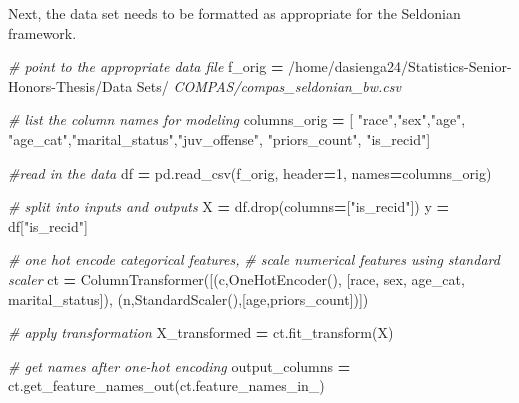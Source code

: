 \documentclass[12pt, twoside]{amherstthesis}
\newenvironment{Shaded}{\begin{snugshade}}{\end{snugshade}}
\newcommand{\CommentTok}[1]{\textcolor[rgb]{0.56,0.35,0.01}{\textit{#1}}}
\newcommand{\DecValTok}[1]{\textcolor[rgb]{0.00,0.00,0.81}{#1}}
\newcommand{\NormalTok}[1]{#1}
\newcommand{\OperatorTok}[1]{\textcolor[rgb]{0.81,0.36,0.00}{\textbf{#1}}}
\newcommand{\StringTok}[1]{\textcolor[rgb]{0.31,0.60,0.02}{#1}}
\begin{document}
\noindent Next, the data set needs to be formatted as appropriate for the Seldonian framework.
\begin{Shaded}
\begin{Highlighting}[]
\CommentTok{\# point to the appropriate data file}
\NormalTok{f\_orig }\OperatorTok{=} \StringTok{\textquotesingle{}/home/dasienga24/Statistics{-}Senior{-}Honors{-}Thesis/Data Sets/\textquotesingle{}}
\CommentTok{\textquotesingle{}COMPAS/compas\_seldonian\_bw.csv\textquotesingle{}}

\CommentTok{\# list the column names for modeling}
\NormalTok{columns\_orig }\OperatorTok{=}\NormalTok{ [}
    \StringTok{"race"}\NormalTok{,}\StringTok{"sex"}\NormalTok{,}\StringTok{"age"}\NormalTok{,}
    \StringTok{"age\_cat"}\NormalTok{,}\StringTok{"marital\_status"}\NormalTok{,}\StringTok{"juv\_offense"}\NormalTok{,}
    \StringTok{"priors\_count"}\NormalTok{, }\StringTok{"is\_recid"}\NormalTok{]}
    
\CommentTok{\#read in the data }
\NormalTok{df }\OperatorTok{=}\NormalTok{ pd.read\_csv(f\_orig, header}\OperatorTok{=}\DecValTok{1}\NormalTok{, names}\OperatorTok{=}\NormalTok{columns\_orig)}

\CommentTok{\# split into inputs and outputs}
\NormalTok{X }\OperatorTok{=}\NormalTok{ df.drop(columns}\OperatorTok{=}\NormalTok{[}\StringTok{"is\_recid"}\NormalTok{])}
\NormalTok{y }\OperatorTok{=}\NormalTok{ df[}\StringTok{"is\_recid"}\NormalTok{]}

\CommentTok{\# one hot encode categorical features,}
\CommentTok{\# scale numerical features using standard scaler }
\NormalTok{ct }\OperatorTok{=}\NormalTok{ ColumnTransformer([(}\StringTok{\textquotesingle{}c\textquotesingle{}}\NormalTok{,OneHotEncoder(),}
\NormalTok{[}\StringTok{\textquotesingle{}race\textquotesingle{}}\NormalTok{, }\StringTok{\textquotesingle{}sex\textquotesingle{}}\NormalTok{, }\StringTok{\textquotesingle{}age\_cat\textquotesingle{}}\NormalTok{, }\StringTok{\textquotesingle{}marital\_status\textquotesingle{}}\NormalTok{]), }
\NormalTok{(}\StringTok{\textquotesingle{}n\textquotesingle{}}\NormalTok{,StandardScaler(),[}\StringTok{\textquotesingle{}age\textquotesingle{}}\NormalTok{,}\StringTok{\textquotesingle{}priors\_count\textquotesingle{}}\NormalTok{])])}
    
\CommentTok{\# apply transformation}
\NormalTok{X\_transformed }\OperatorTok{=}\NormalTok{ ct.fit\_transform(X)}
    
\CommentTok{\# get names after one{-}hot encoding}
\NormalTok{output\_columns }\OperatorTok{=}\NormalTok{ ct.get\_feature\_names\_out(ct.feature\_names\_in\_)}
    

\end{Highlighting}
\end{Shaded}
\end{document}
